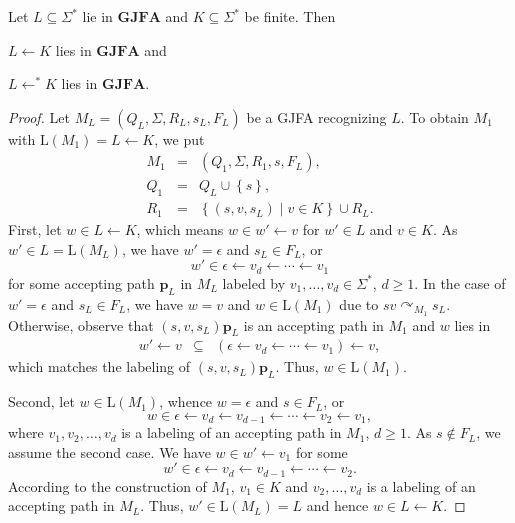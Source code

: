 \documentclass{ws-ijmpc}
\begin{document}
\begin{lemma}
\label{GJFA closed under <- and <-hv}Let $L\subseteq\Sigma^{*}$
lie in $\mathbf{GJFA}$ and $K\subseteq\Sigma^{*}$ be finite. Then
\begin{romanlist}
\item $L\leftarrow K$ lies in $\mathbf{GJFA}$ and
\item $L\leftarrow^{*}K$ lies in $\mathbf{GJFA}$. 
\end{romanlist}
\end{lemma}
\begin{proof}
Let $M_{L}=\left(Q_{L},\Sigma,R_{L},s_{L},F_{L}\right)$ be a GJFA
recognizing $L$. To obtain $M_{1}$ with $\mathrm{L}\!\left(M_{1}\right)=L\leftarrow K$,
we put 
\begin{eqnarray*}
M_{1} & = & \left(Q_{1},\Sigma,R_{1},s,F_{L}\right),\\
Q_{1} & = & Q_{L}\cup\left\{ s\right\} ,\\
R_{1} & = & \left\{ \left(s,v,s_{L}\right)\mid v\in K\right\} \cup R_{L}.
\end{eqnarray*}
First, let $w\in L\leftarrow K$, which means $w\in w'\leftarrow v$
for $w'\in L$ and $v\in K$. As $w'\in L=\mathrm{L}\!\left(M_{L}\right)$,
we have $w'=\epsilon$ and $s_{L}\in F_{L}$, or 
\[
w'\in\epsilon\leftarrow v_{d}\leftarrow\cdots\leftarrow v_{1}
\]
for some accepting path $\mathbf{p}_{L}$ in $M_{L}$ labeled by $v_{1},\dots,v_{d}\in\Sigma^{*}$,
$d\ge1$. In the case of $w'=\epsilon$ and $s_{L}\in F_{L}$, we
have $w=v$ and $w\in\mathrm{L}\!\left(M_{1}\right)$ due to $sv\curvearrowright_{M_{1}}s_{L}$.
Otherwise, observe that $\left(s,v,s_{L}\right)\mathbf{p}_{L}$ is
an accepting path in $M_{1}$ and $w$ lies in
\begin{eqnarray*}
w'\leftarrow v & \subseteq & \left(\epsilon\leftarrow v_{d}\leftarrow\cdots\leftarrow v_{1}\right)\leftarrow v,
\end{eqnarray*}
which matches the labeling of $\left(s,v,s_{L}\right)\mathbf{p}_{L}$.
Thus, $w\in\mathrm{L}\!\left(M_{1}\right)$.

Second, let $w\in\mathrm{L}\!\left(M_{1}\right)$, whence $w=\epsilon$
and $s\in F_{L}$, or 
\[
w\in\epsilon\leftarrow v_{d}\leftarrow v_{d-1}\leftarrow\cdots\leftarrow v_{2}\leftarrow v_{1},
\]
where $v_{1},v_{2},\dots,v_{d}$ is a labeling of an accepting path
in $M_{1}$, $d\ge1$. As $s\notin F_{L}$, we assume the second case.
We have $w\in w'\leftarrow v_{1}$ for some 
\[
w'\in\epsilon\leftarrow v_{d}\leftarrow v_{d-1}\leftarrow\cdots\leftarrow v_{2}.
\]
According to the construction of $M_{1}$, $v_{1}\in K$ and $v_{2},\dots,v_{d}$
is a labeling of an accepting path in $M_{L}$. Thus, $w'\in\mathrm{L}\!\left(M_{L}\right)=L$
and hence $w\in L\leftarrow K$.


\end{proof}
\end{document}
